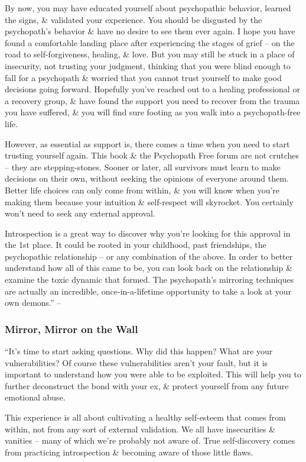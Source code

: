 \documentclass{article}
\numberwithin{equation}{section}
\begin{document}
By now, you may have educated yourself about psychopathic behavior, learned the signs, \& validated your experience. You should be disgusted by the psychopath's behavior \& have no desire to see them ever again. I hope you have found a comfortable landing place after experiencing the stages of grief -- on the road to self-forgiveness, healing, \& love. But you may still be stuck in a place of insecurity, not trusting your judgment, thinking that you were blind enough to fall for a psychopath \& worried that you cannot trust yourself to make good decisions going forward. Hopefully you've reached out to a healing professional or a recovery group, \& have found the support you need to recover from the trauma you have suffered, \& you will find sure footing as you walk into a psychopath-free life.

However, as essential as support is, there comes a time when you need to start trusting yourself again. This book \& the Psychopath Free forum are not crutches -- they are stepping-stones. Sooner or later, all survivors must learn to make decisions on their own, without seeking the opinions of everyone around them. Better life choices can only come from within, \& you will know when you're making them because your intuition \& self-respect will skyrocket. You certainly won't need to seek any external approval.

Introspection is a great way to discover why you're looking for this approval in the 1st place. It could be rooted in your childhood, past friendships, the psychopathic relationship -- or any combination of the above. In order to better understand how all of this came to be, you can look back on the relationship \& examine the toxic dynamic that formed. The psychopath's mirroring techniques are actually an incredible, once-in-a-lifetime opportunity to take a look at your own demons.'' -- \cite[pp. 148--149]{MacKenzie2015}

\subsubsection{Mirror, Mirror on the Wall}
``It's time to start asking questions. Why did this happen? What are your vulnerabilities? Of course these vulnerabilities aren't your fault, but it is important to understand how you were able to be exploited. This will help you to further deconstruct the bond with your ex, \& protect yourself from any future emotional abuse.

This experience is all about cultivating a healthy self-esteem that comes from within, not from any sort of external validation. We all have insecurities \& vanities -- many of which we're probably not aware of. True self-discovery comes from practicing introspection \& becoming aware of those little flaws.
\end{document}

